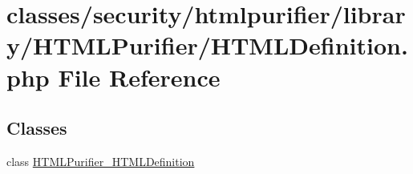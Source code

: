 \hypertarget{HTMLDefinition_8php}{\section{classes/security/htmlpurifier/library/\+H\+T\+M\+L\+Purifier/\+H\+T\+M\+L\+Definition.php File Reference}
\label{HTMLDefinition_8php}
}
\subsection*{Classes}
\begin{DoxyCompactItemize}
\item 
class \hyperlink{classHTMLPurifier__HTMLDefinition}{H\+T\+M\+L\+Purifier\+\_\+\+H\+T\+M\+L\+Definition}
\end{DoxyCompactItemize}
